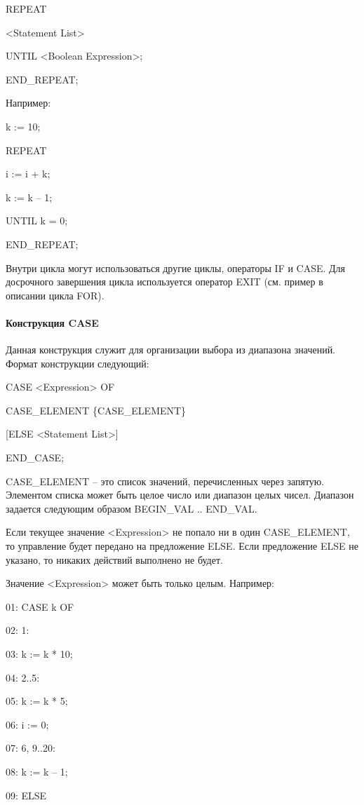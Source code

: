 \documentclass[letterpaper,10pt,russian]{sphinxmanual}
\begin{document}
REPEAT

\textless{}Statement List\textgreater{}

UNTIL \textless{}Boolean Expression\textgreater{};

END\_REPEAT;

Например:

k := 10;

REPEAT

i := i + k;

k := k – 1;

UNTIL k = 0;

END\_REPEAT;

Внутри цикла могут использоваться другие циклы, операторы IF и CASE. Для
досрочного завершения цикла используется оператор EXIT (см. пример в
описании цикла FOR).


\paragraph{Конструкция CASE}
\label{iec_guide/st_guide:case}
Данная конструкция служит для организации выбора из диапазона значений.
Формат конструкции следующий:

CASE \textless{}Expression\textgreater{} OF

CASE\_ELEMENT \{CASE\_ELEMENT\}

{[}ELSE \textless{}Statement List\textgreater{}{]}

END\_CASE;

CASE\_ELEMENT – это список значений, перечисленных через запятую.
Элементом списка может быть целое число или диапазон целых чисел.
Диапазон задается следующим образом BEGIN\_VAL .. END\_VAL.

Если текущее значение \textless{}Expression\textgreater{} не попало ни в один CASE\_ELEMENT, то
управление будет передано на предложение ELSE. Если предложение ELSE не
указано, то никаких действий выполнено не будет.

Значение \textless{}Expression\textgreater{} может быть только целым. Например:

01: CASE k OF

02: 1:

03: k := k * 10;

04: 2..5:

05: k := k * 5;

06: i := 0;

07: 6, 9..20:

08: k := k – 1;

09: ELSE
\end{document}
